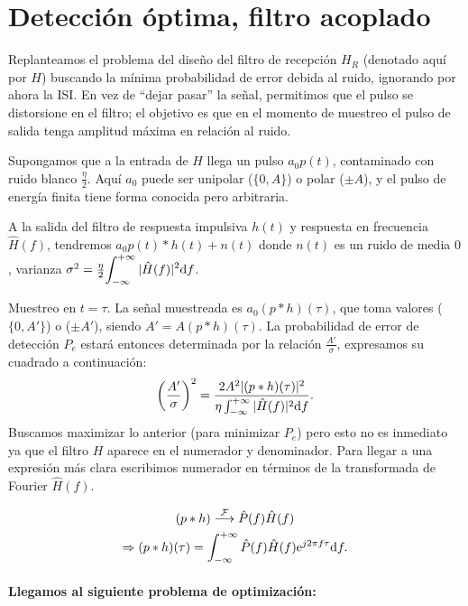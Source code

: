 \section{Detección óptima, filtro acoplado}

Replanteamos el problema del diseño del filtro de recepción $H_R$
(denotado aquí por $H$) buscando la mínima probabilidad de error
debida al ruido, ignorando por ahora la ISI. En vez de ``dejar
pasar'' la señal, permitimos que el pulso se distorsione en el
filtro; el objetivo es que en el momento de muestreo el pulso de
salida tenga amplitud máxima en relación al ruido.

Supongamos que a la entrada de $H$ llega un pulso $a_0 p(t)$,
contaminado con ruido blanco $\frac{\eta}{2}$. Aquí $a_0$ puede
ser unipolar ($\{0,A\}$) o polar ($\pm A$), y el pulso de energía
finita tiene forma conocida pero arbitraria.

A la salida del filtro de respuesta impulsiva $h(t)$  y respuesta
en frecuencia $\hat{H}(f)$, tendremos $a_0 p(t) \ast h(t) + n(t)$
donde $n(t)$ es un ruido de media $0$, varianza
$\sigma^2=\frac{\eta}{2}\displaystyle{\int_{-\infty}^{+\infty}
|\hat{H}(f)|^2\ensuremath{\mathrm{d}}f}$.



Muestreo en $t=\tau$. La señal muestreada es $a_0(p\ast h)
(\tau)$, que toma valores ($\{0,A'\}$) o ($\pm A'$), siendo
$A'=A(p\ast h)(\tau)$. La probabilidad de error de detección $P_e$
estará entonces determinada por la relación $\frac{A'}{\sigma}$,
expresamos su cuadrado a continuación:
%
\[\left(\frac{A'}{\sigma}\right)^2 = \frac{2 A^2 |(p\ast
h)(\tau)|^2}{\eta \int_{-\infty}^{+\infty} |\hat{H}(f)|^2\mathrm{d} f}.\]
Buscamos maximizar lo anterior (para minimizar $P_e$) pero esto no
es inmediato ya que el filtro $H$ aparece en el numerador y
denominador. Para llegar a una expresión más clara escribimos
numerador en términos de la transformada de Fourier $\hat{H}(f)$.

\begin{gather*}
    (p\ast h) \stackrel{\mathcal{F}}{\longrightarrow} \hat{P}(f) \hat{H}(f)\\
    \Rightarrow (p\ast h)(\tau) = \int_{-\infty}^{+\infty} \hat{P}(f)
\hat{H}(f) \mathrm{e}^{j2\pi f \tau}\mathrm{d} f.
\end{gather*}

\paragraph{Llegamos al siguiente problema de optimización:}

